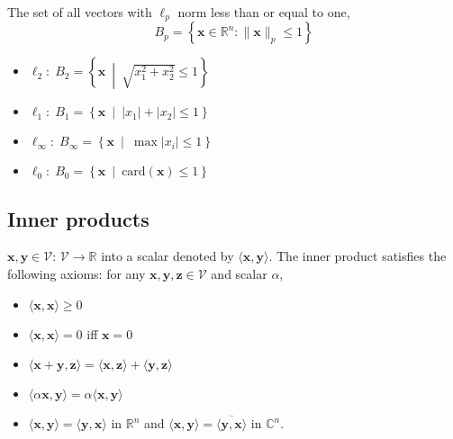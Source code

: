 \documentclass{article}
\begin{document}
            \begin{definition}
                The set of all vectors with $\ell_p$ norm less than or equal to one, 
                \begin{equation}
                    B_p = \left\{ \mathbf{x} \in \mathbb{R}^n : \| \mathbf{x} \|_p \leq 1 \right\}
                \end{equation}
            \end{definition}

            \begin{example}
                \begin{itemize}
                    \item \( \ell_2: \; B_2 = \left\{ \mathbf{x} \ \middle| \ \sqrt{x_1^2 + x_2^2} \leq 1 \right\} \)
                    \item \( \ell_1: \; B_1 = \left\{ \mathbf{x} \ \middle| \ |x_1| + |x_2| \leq 1 \right\} \)
                    \item \( \ell_\infty: \; B_\infty = \left\{ \mathbf{x} \ \middle| \ \max |x_i| \leq 1 \right\} \)
                    \item \( \ell_0: \; B_0 = \left\{ \mathbf{x} \ \middle| \ \text{card}(\mathbf{x}) \leq 1 \right\} \)
                \end{itemize}

            \end{example}
    \subsection{Inner products}
        \begin{definition}
            \( \mathbf{x}, \mathbf{y} \in \mathcal{V} \): $\mathcal{V}\rightarrow \mathbb{R}$ into a scalar denoted by \( \langle \mathbf{x}, \mathbf{y} \rangle \). The inner product satisfies the following axioms: for any \( \mathbf{x}, \mathbf{y}, \mathbf{z} \in \mathcal{V} \) and scalar \( \alpha \),

            \begin{itemize}
                \item \( \langle \mathbf{x}, \mathbf{x} \rangle \geq 0 \)
                \item \( \langle \mathbf{x}, \mathbf{x} \rangle = 0 \) iff \( \mathbf{x} = 0 \)
                \item \( \langle \mathbf{x} + \mathbf{y}, \mathbf{z} \rangle = \langle \mathbf{x}, \mathbf{z} \rangle + \langle \mathbf{y}, \mathbf{z} \rangle \)
                \item \( \langle \alpha \mathbf{x}, \mathbf{y} \rangle = \alpha \langle \mathbf{x}, \mathbf{y} \rangle \)
                \item \( \langle \mathbf{x}, \mathbf{y} \rangle = \langle \mathbf{y}, \mathbf{x} \rangle \) in $\mathbb{R}^n$ and \( \langle \mathbf{x}, \mathbf{y} \rangle = \overline{\langle \mathbf{y}, \mathbf{x} \rangle} \) in \( \mathbb{C}^n \).
            \end{itemize}
        \end{definition}
\end{document}
